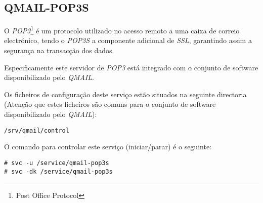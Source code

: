 \subsection{QMAIL-POP3S}

O \emph{POP3}\footnote{Post Office Protocol} é um protocolo utilizado no acesso remoto a uma caixa de correio electrónico, tendo o \emph{POP3S} a componente adicional de \emph{SSL}, garantindo assim a segurança na transacção dos dados.

Especificamente este servidor de \emph{POP3} está integrado com o conjunto de software disponibilizado pelo \emph{QMAIL}.

Os ficheiros de configuração deste serviço estão situados na seguinte directoria (Atenção que estes ficheiros são comuns para o conjunto de software disponibilizado pelo \emph{QMAIL}):

\begin{Verbatim}[commandchars=\\\{\}]
/srv/qmail/control
\end{Verbatim}

O comando para controlar este serviço (iniciar/parar) é o seguinte:

\begin{Verbatim}[commandchars=\\\{\}]
# svc -u /service/qmail-pop3s
# svc -dk /service/qmail-pop3s
\end{Verbatim}

